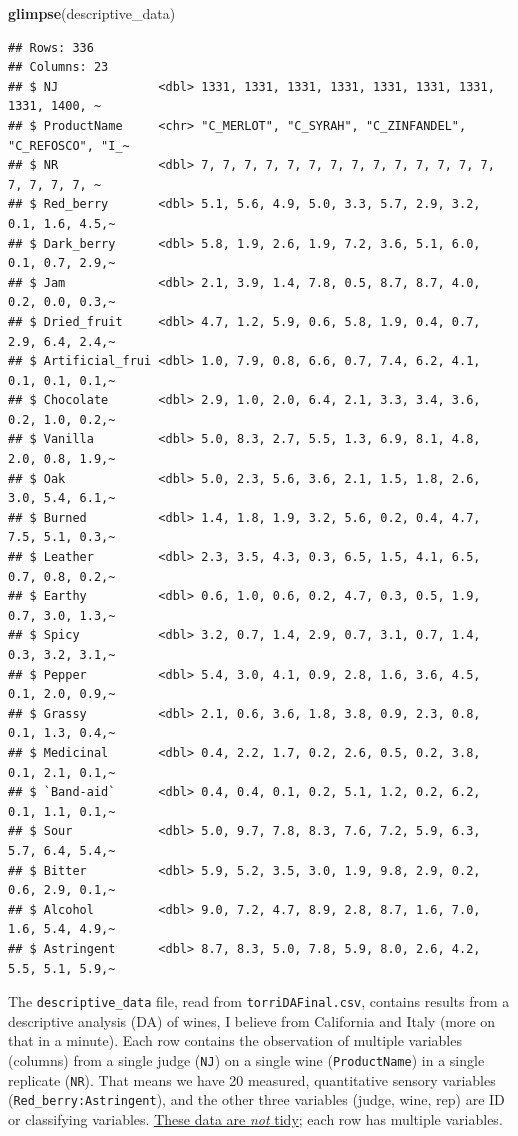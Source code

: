 \documentclass[
]{book}
\newenvironment{Shaded}{\begin{snugshade}}{\end{snugshade}}
\newcommand{\FunctionTok}[1]{\textcolor[rgb]{0.13,0.29,0.53}{\textbf{#1}}}
\newcommand{\NormalTok}[1]{#1}
\begin{document}
\begin{Shaded}
\begin{Highlighting}[]
\FunctionTok{glimpse}\NormalTok{(descriptive\_data)}
\end{Highlighting}
\end{Shaded}

\begin{verbatim}
## Rows: 336
## Columns: 23
## $ NJ              <dbl> 1331, 1331, 1331, 1331, 1331, 1331, 1331, 1331, 1400, ~
## $ ProductName     <chr> "C_MERLOT", "C_SYRAH", "C_ZINFANDEL", "C_REFOSCO", "I_~
## $ NR              <dbl> 7, 7, 7, 7, 7, 7, 7, 7, 7, 7, 7, 7, 7, 7, 7, 7, 7, 7, ~
## $ Red_berry       <dbl> 5.1, 5.6, 4.9, 5.0, 3.3, 5.7, 2.9, 3.2, 0.1, 1.6, 4.5,~
## $ Dark_berry      <dbl> 5.8, 1.9, 2.6, 1.9, 7.2, 3.6, 5.1, 6.0, 0.1, 0.7, 2.9,~
## $ Jam             <dbl> 2.1, 3.9, 1.4, 7.8, 0.5, 8.7, 8.7, 4.0, 0.2, 0.0, 0.3,~
## $ Dried_fruit     <dbl> 4.7, 1.2, 5.9, 0.6, 5.8, 1.9, 0.4, 0.7, 2.9, 6.4, 2.4,~
## $ Artificial_frui <dbl> 1.0, 7.9, 0.8, 6.6, 0.7, 7.4, 6.2, 4.1, 0.1, 0.1, 0.1,~
## $ Chocolate       <dbl> 2.9, 1.0, 2.0, 6.4, 2.1, 3.3, 3.4, 3.6, 0.2, 1.0, 0.2,~
## $ Vanilla         <dbl> 5.0, 8.3, 2.7, 5.5, 1.3, 6.9, 8.1, 4.8, 2.0, 0.8, 1.9,~
## $ Oak             <dbl> 5.0, 2.3, 5.6, 3.6, 2.1, 1.5, 1.8, 2.6, 3.0, 5.4, 6.1,~
## $ Burned          <dbl> 1.4, 1.8, 1.9, 3.2, 5.6, 0.2, 0.4, 4.7, 7.5, 5.1, 0.3,~
## $ Leather         <dbl> 2.3, 3.5, 4.3, 0.3, 6.5, 1.5, 4.1, 6.5, 0.7, 0.8, 0.2,~
## $ Earthy          <dbl> 0.6, 1.0, 0.6, 0.2, 4.7, 0.3, 0.5, 1.9, 0.7, 3.0, 1.3,~
## $ Spicy           <dbl> 3.2, 0.7, 1.4, 2.9, 0.7, 3.1, 0.7, 1.4, 0.3, 3.2, 3.1,~
## $ Pepper          <dbl> 5.4, 3.0, 4.1, 0.9, 2.8, 1.6, 3.6, 4.5, 0.1, 2.0, 0.9,~
## $ Grassy          <dbl> 2.1, 0.6, 3.6, 1.8, 3.8, 0.9, 2.3, 0.8, 0.1, 1.3, 0.4,~
## $ Medicinal       <dbl> 0.4, 2.2, 1.7, 0.2, 2.6, 0.5, 0.2, 3.8, 0.1, 2.1, 0.1,~
## $ `Band-aid`      <dbl> 0.4, 0.4, 0.1, 0.2, 5.1, 1.2, 0.2, 6.2, 0.1, 1.1, 0.1,~
## $ Sour            <dbl> 5.0, 9.7, 7.8, 8.3, 7.6, 7.2, 5.9, 6.3, 5.7, 6.4, 5.4,~
## $ Bitter          <dbl> 5.9, 5.2, 3.5, 3.0, 1.9, 9.8, 2.9, 0.2, 0.6, 2.9, 0.1,~
## $ Alcohol         <dbl> 9.0, 7.2, 4.7, 8.9, 2.8, 8.7, 1.6, 7.0, 1.6, 5.4, 4.9,~
## $ Astringent      <dbl> 8.7, 8.3, 5.0, 7.8, 5.9, 8.0, 2.6, 4.2, 5.5, 5.1, 5.9,~
\end{verbatim}

The \texttt{descriptive\_data} file, read from \texttt{torriDAFinal.csv}, contains results from a descriptive analysis (DA) of wines, I believe from California and Italy (more on that in a minute). Each row contains the observation of multiple variables (columns) from a single judge (\texttt{NJ}) on a single wine (\texttt{ProductName}) in a single replicate (\texttt{NR}). That means we have 20 measured, quantitative sensory variables (\texttt{Red\_berry:Astringent}), and the other three variables (judge, wine, rep) are ID or classifying variables. \href{https://r4ds.hadley.nz/data-tidy.html}{These data are \emph{not} tidy}; each row has multiple variables.
\end{document}
